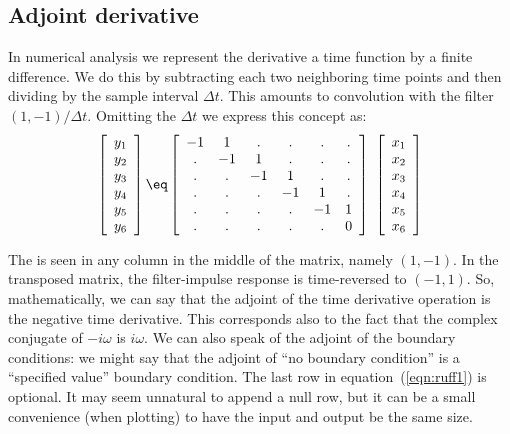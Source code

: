 \subsection{Adjoint derivative}
In numerical analysis we represent the derivative a time function
by a finite difference.
We do this by subtracting each two neighboring time points and then
dividing by the sample interval $\Delta t$.
This amounts to convolution with the filter $(1,-1)/\Delta t$.
Omitting the $\Delta t$ we express this concept as:
\begin{equation}
\left[ \begin{array}{c}
        y_1 \\
        y_2 \\
        y_3 \\
        y_4 \\
        y_5 \\
        y_6
        \end{array} \right]
\eq
\left[ \begin{array}{cccccc}
        -1& 1& .& .& .& . \\
         .&-1& 1& .& .& . \\
         .& .&-1& 1& .& . \\
         .& .& .&-1& 1& . \\
         .& .& .& .&-1& 1 \\
         .& .& .& .& .& 0
        \end{array} \right] \ 
\left[ \begin{array}{c}
        x_1 \\
        x_2 \\
        x_3 \\
        x_4 \\
        x_5 \\
        x_6
        \end{array} \right]
 \label{eqn:ruff1}
\end{equation}
\par
The  is seen in any column
in the middle of the matrix, namely $(1,-1)$. 
In the transposed matrix,
the filter-impulse response
is time-reversed to $(-1,1)$.
So, mathematically,
we can say that the adjoint of the time derivative operation
is the negative time derivative.
This corresponds also to the fact that
the complex conjugate of $-i\omega$ is $i\omega$.
We can also speak of the adjoint of the boundary conditions:
we might say that the adjoint of ``no boundary condition''
is a ``specified value'' boundary condition.
The last row in equation~(\ref{eqn:ruff1}) is optional.
It may seem unnatural to append a null row, but it can be a small
convenience (when plotting) to have the input and output be the same size.
\par

